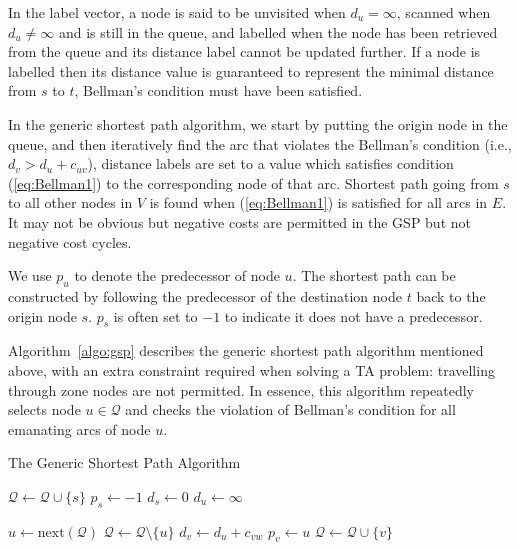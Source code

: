 In the label vector,
a node is said to be unvisited when $d_u = \infty$,
scanned when $d_u \neq \infty$ and is still in the queue,
and labelled when the node has been retrieved from the queue and its distance label cannot be updated further.
If a node is labelled then its distance value is guaranteed to represent the minimal distance from $s$ to $t$, Bellman's condition must have been satisfied.

In the generic shortest path algorithm,
we start by putting the origin node in the queue,
and then iteratively find the arc that violates the Bellman's condition (i.e., $d_v > d_u + c_{uv}$),
distance labels are set to a value which satisfies condition (\ref{eq:Bellman1}) to the corresponding node of that arc.
Shortest path going from $s$ to all other nodes in $V$ is found when (\ref{eq:Bellman1}) is satisfied for all arcs in $E$.
It may not be obvious but negative costs are permitted in the GSP but not negative cost cycles.

We use $p_u$ to denote the predecessor of node $u$.
The shortest path can be constructed by following the predecessor of the destination node $t$ back to the origin node $s$. $p_s$ is often set to $-1$ to indicate it does not have a predecessor.


Algorithm~\ref{algo:gsp} describes the generic shortest path algorithm mentioned above,
with an extra constraint required when solving a TA problem: travelling through zone nodes are not permitted.
In essence, this algorithm repeatedly selects node $u\in\mathcal{Q}$ and checks the violation of Bellman's condition for all emanating arcs of node $u$.
\begin{algorithm}
    \caption{The Generic Shortest Path Algorithm \citep{Klunder}}
    \label{algo:gsp}
    \begin{algorithmic}[1]
        \State $\mathcal{Q} \gets \mathcal{Q} \cup \{s\}$ 
        \State $p_s \gets -1$ 
        \State $d_s \gets 0$
         
        \State $d_u \gets \infty$
    \EndFor

    \State $ u \gets \text{next}(\mathcal{Q}) $ 
    \State $ \mathcal{Q} \gets \mathcal{Q} \setminus \{u\} $
     
    \State $d_v \gets d_u + c_{vw}$
    \State $p_v \gets u$
    \State $\mathcal{Q} \gets \mathcal{Q} \cup \{v\}$ 
\EndIf
                    \EndIf
                \EndFor
            \EndIf
        \EndWhile
    \EndProcedure
\end{algorithmic}
\end{algorithm}

